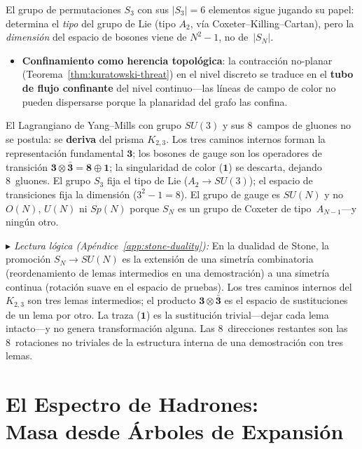 \documentclass[11pt, a4paper, openany]{book}
\newcommand{\stoneref}[1]{%
  \smallskip\noindent
  {\small\color{structure!70}\textit{$\blacktriangleright$ Lectura
  l\'ogica (Ap\'endice~\ref{app:stone-duality}):} #1}%
  \smallskip}
\begin{document}
El grupo de permutaciones $S_3$ con sus $|S_3| = 6$ elementos sigue
jugando su papel: determina el \emph{tipo} del grupo de Lie (tipo
$A_2$, v\'ia Coxeter--Killing--Cartan), pero la \emph{dimensi\'on} del
espacio de bosones viene de $N^2 - 1$, no de~$|S_N|$.

\begin{itemize}
  \item \textbf{Confinamiento como herencia topol\'ogica}: la
    contracci\'on no-planar (Teorema~\ref{thm:kuratowski-threat}) en el
    nivel discreto se traduce en el \textbf{tubo de flujo
    confinante} del nivel continuo---las l\'ineas de campo de color
    no pueden dispersarse porque la planaridad del grafo las confina.
\end{itemize}

\begin{result}[title={Los 8 gluones desde la topolog\'ia bipartita}]
\label{res:yang-mills-8-gluons}
El Lagrangiano de Yang--Mills con grupo $SU(3)$ y sus 8~campos de
gluones no se postula: se \textbf{deriva} del prisma $K_{2,3}$.
Los tres caminos internos forman la representaci\'on fundamental
$\mathbf{3}$; los bosones de gauge son los operadores de transici\'on
$\mathbf{3} \otimes \bar{\mathbf{3}} = \mathbf{8} \oplus \mathbf{1}$;
la singularidad de color ($\mathbf{1}$) se descarta, dejando 8~gluones.
El grupo $S_3$ fija el tipo de Lie ($A_2 \to SU(3)$); el espacio de
transiciones fija la dimensi\'on ($3^2 - 1 = 8$). El grupo de gauge es
$SU(N)$ y no $O(N)$, $U(N)$ ni $Sp(N)$ porque $S_N$ es un grupo de
Coxeter de tipo~$A_{N-1}$---y ning\'un otro.
\end{result}

\stoneref{En la dualidad de Stone, la promoci\'on $S_N \to SU(N)$ es
la extensi\'on de una simetr\'ia combinatoria (reordenamiento de
lemas intermedios en una demostraci\'on) a una simetr\'ia continua
(rotaci\'on suave en el espacio de pruebas). Los tres caminos internos
del $K_{2,3}$ son tres lemas intermedios; el producto
$\mathbf{3} \otimes \bar{\mathbf{3}}$ es el espacio de sustituciones
de un lema por otro. La traza ($\mathbf{1}$) es la sustituci\'on
trivial---dejar cada lema intacto---y no genera transformaci\'on
alguna. Las 8~direcciones restantes son las 8~rotaciones no triviales
de la estructura interna de una demostraci\'on con tres lemas.}

\chapter[El Espectro de Hadrones: Masa desde \'Arboles de Expansi\'on]{El Espectro de Hadrones:\\Masa desde \'Arboles de Expansi\'on}
\label{ch:hadrons}
\end{document}
